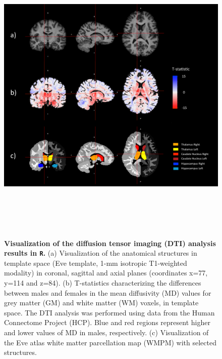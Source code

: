 \documentclass[]{elsarticle} %
\newcommand{\rlang}{\texttt{R}}
\begin{document}
\begin{figure}[!ht]
  \begin{center}
    \caption{\textbf{Visualization of the diffusion tensor imaging (DTI) analysis results in {\rlang}.} (a) Visualization of the anatomical structures in template space (Eve template, 1-mm isotropic T1-weighted modality) in coronal, sagittal and axial planes (coordinates x=77, y=114 and z=84). (b) T-statistics characterizing the differences between males and females in the mean diffusivity (MD) values for grey matter (GM) and white matter (WM) voxels, in template space. The DTI analysis was performed using data from the Human Connectome Project (HCP). Blue and red regions represent higher and lower values of MD in males, respectively. (c) Visualization of the Eve atlas white matter parcellation map (WMPM) with selected structures.} 
    \includegraphics[height=5.5in]{figures/figure_dti.pdf}
    \label{fig:dti}
  \end{center}
\end{figure}

\end{document}
